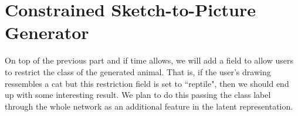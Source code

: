 \documentclass[a4paper]{article}
\begin{document}
%
%
%
\section{Constrained Sketch-to-Picture Generator}
On top of the previous part and if time allows, we will add a field to allow users to restrict the class of the generated animal. That is, if the user's drawing ressembles a cat but this restriction field is set to ``reptile", then we should end up with some interesting result. We plan to do this passing the class label through the whole network as an additional feature in the latent representation.



\end{document}
